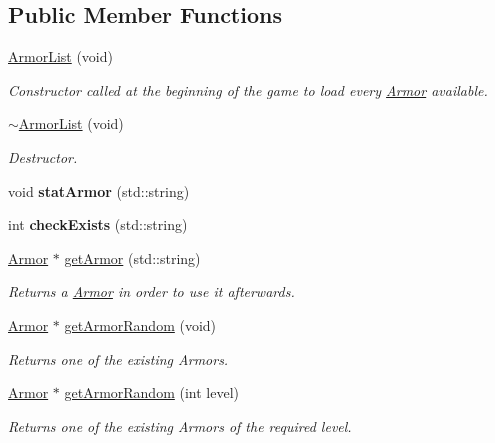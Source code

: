 \subsection*{Public Member Functions}
\begin{DoxyCompactItemize}
\item 
\hyperlink{class_armor_list_a77aad7caa0b66226bcbe6b7f6c5307cb}{Armor\+List} (void)
\begin{DoxyCompactList}\small\item\em Constructor called at the beginning of the game to load every \hyperlink{class_armor}{Armor} available. \end{DoxyCompactList}\item 
\hyperlink{class_armor_list_ace93dfe766072cab2b1d6dd244f50bc2}{$\sim$\+Armor\+List} (void)
\begin{DoxyCompactList}\small\item\em Destructor. \end{DoxyCompactList}\item 
\hypertarget{class_armor_list_aa83b2c08630539e6c378f0229e043ea0}{void {\bfseries stat\+Armor} (std\+::string)}\label{class_armor_list_aa83b2c08630539e6c378f0229e043ea0}

\item 
\hypertarget{class_armor_list_abc37044c50cbef4c623b7967d52ce8fb}{int {\bfseries check\+Exists} (std\+::string)}\label{class_armor_list_abc37044c50cbef4c623b7967d52ce8fb}

\item 
\hyperlink{class_armor}{Armor} $\ast$ \hyperlink{class_armor_list_aab5a62f59a37e389b50d196db790b4c5}{get\+Armor} (std\+::string)
\begin{DoxyCompactList}\small\item\em Returns a \hyperlink{class_armor}{Armor} in order to use it afterwards. \end{DoxyCompactList}\item 
\hyperlink{class_armor}{Armor} $\ast$ \hyperlink{class_armor_list_af51417f1402e0e636472b129765131b6}{get\+Armor\+Random} (void)
\begin{DoxyCompactList}\small\item\em Returns one of the existing Armors. \end{DoxyCompactList}\item 
\hyperlink{class_armor}{Armor} $\ast$ \hyperlink{class_armor_list_a41e2e8dda433134261edc53ff5f2fc47}{get\+Armor\+Random} (int level)
\begin{DoxyCompactList}\small\item\em Returns one of the existing Armors of the required level. \end{DoxyCompactList}\end{DoxyCompactItemize}
